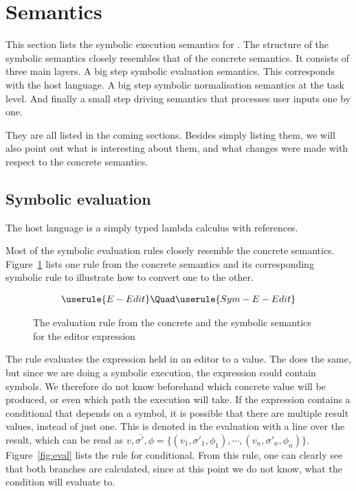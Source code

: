 

\section{Semantics}
\label{sec:semantics}

This section lists the symbolic execution semantics for \TOPHAT.
The structure of the symbolic semantics closely resembles that of the concrete semantics.
It consists of three main layers.
A big step symbolic evaluation semantics.
This corresponds with the host language.
A big step symbolic normalisation semantics at the task level.
And finally a small step driving semantics that processes user inputs one by one.

They are all listed in the coming sections.
Besides simply listing them, we will also point out what is interesting about them,
and what changes were made with respect to the concrete semantics.

\subsection{Symbolic evaluation}

The host language is a simply typed lambda calculus with references.

Most of the symbolic evaluation rules closely resemble the concrete semantics.
Figure~\ref{fig:oldToNewSemantics} lists one rule from the concrete semantics and its corresponding symbolic rule to illustrate how to convert one to the other.

\begin{figure}[h]
  \small
  \begin{gather*}
    \userule{E-Edit}\Quad
    \userule{Sym-E-Edit}
  \end{gather*}
  \caption{The evaluation rule from the concrete and the symbolic semantics for the editor expression}
  \label{fig:oldToNewSemantics}
\end{figure}

The  rule evaluates the expression held in an editor to a value.
The  does the same, but since we are doing a symbolic execution, the expression could contain symbols.
We therefore do not know beforehand which concrete value will be produced, or even which path the execution will take.
If the expression contains a conditional that depends on a symbol, it is possible that there are multiple result values, instead of just one.
This is denoted in the evaluation with a line over the result, which can be read as $\overline{v,\sigma',\phi} = \{(v_1,\sigma'_1,\phi_1),\cdots,(v_n,\sigma'_n,\phi_n)\}$.
Figure~\ref{fig:eval} lists the rule for conditional.
From this rule, one can clearly see that both branches are calculated, since at this point we do not know, what the condition will evaluate to.

